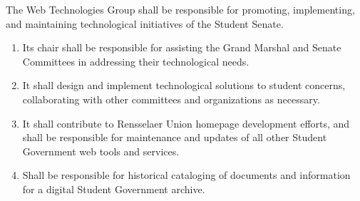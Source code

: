 \item The Web Technologies Group shall be responsible for promoting, implementing, and maintaining technological initiatives of
the Student Senate.
\begin{enumerate}
\item Its chair shall be responsible for assisting the Grand Marshal and Senate Committees in addressing their technological
needs.
\item It shall design and implement technological solutions to student concerns, collaborating with other committees and
organizations as necessary.
\item It shall contribute to Rensselaer Union homepage development efforts, and shall be responsible for maintenance and
updates of all other Student Government web tools and services.
\item Shall be responsible for historical cataloging of documents and information for a digital Student Government archive.
\end{enumerate}
